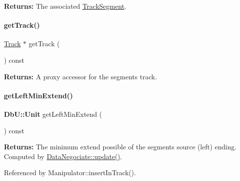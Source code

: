 {\bfseries Returns\+:} The associated \hyperlink{classKite_1_1TrackSegment}{Track\+Segment}. \mbox{\label{classKite_1_1DataNegociate_a3f34f9139b8491a0adb531ac3a904171}} 
\paragraph{\texorpdfstring{get\+Track()}{getTrack()}}
{\footnotesize\ttfamily \hyperlink{classKite_1_1Track}{Track} $\ast$ get\+Track (\begin{DoxyParamCaption}{ }\end{DoxyParamCaption}) const\hspace{0.3cm}{\ttfamily [inline]}}

{\bfseries Returns\+:} A proxy accessor for the segment\textquotesingle{}s track. \mbox{\label{classKite_1_1DataNegociate_a56149c72d0bfe5e33795782b646061b1}} 
\paragraph{\texorpdfstring{get\+Left\+Min\+Extend()}{getLeftMinExtend()}}
{\footnotesize\ttfamily \textbf{ Db\+U\+::\+Unit} get\+Left\+Min\+Extend (\begin{DoxyParamCaption}{ }\end{DoxyParamCaption}) const\hspace{0.3cm}{\ttfamily [inline]}}

{\bfseries Returns\+:} The minimum extend possible of the segment\textquotesingle{}s source (left) ending. Computed by \hyperlink{classKite_1_1DataNegociate_ac5c54df7ed3b930268c8d7752c101725}{Data\+Negociate\+::update()}. 

Referenced by Manipulator\+::insert\+In\+Track().

\mbox{\label{classKite_1_1DataNegociate_abf06c826acae81494b01b904d3277cc1}} 
